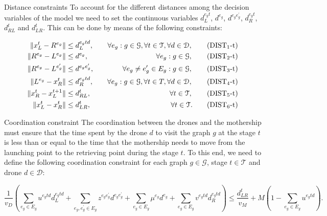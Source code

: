 \documentclass[slidestop,usepdftitle=false,10pt]{beamer}
\begin{document}
	\begin{frame}{Distance constraints}
	    To account for the different distances among the decision variables of the model we need to set the continuous variables $d_L^{e_gt}$, $d^{e_g}$, $d^{e_ge^\prime_g}$, $d_R^{e_gt}$, $d_{RL}^t$ and $d_{LR}^t$. This can be done by means of the following constraints:
        
        \begin{align*}
        \|x_L^t- R^{e_g}\| & \leq  d_L^{e_gtd},  &\quad \forall e_g:g\in \mathcal{G}, \forall t\in \mathcal T, \forall d\in\mathcal D, \tag{DIST$_{1}$-t} \label{eq:d1d}\\
        \|R^{e_g}- L^{e_g}\| & \leq  d^{e_g},  &\quad \forall e_g:g\in \mathcal{G}, \tag{DIST$_{2}$-t} \label{eq:d2}\\
        \|R^{e_g}- L^{e^\prime_g}\| & \leq  d^{e_ge^\prime_g}, &\quad \forall e_g\neq e_g'\in E_g:g\in \mathcal{G}, \tag{DIST$_{3}$-t} \label{eq:d3}\\
        \|L^{e_g}- x_R^t\| & \leq  d_R^{e_gtd}, &\quad \forall e_g:g\in \mathcal{G},\forall t\in T, \forall d\in\mathcal D, \tag{DIST$_{4}$-t} \label{eq:d4}\\
        \|x_R^t- x_L^{t+1}\| & \leq  d_{RL}^t, & \quad \forall t\in \mathcal T, \tag{DIST$_{5}$-t} \label{eq:d5}\\
        \|x_L^t- x_R^t\| & \leq  d_{LR}^t, & \quad \forall t\in \mathcal T. \tag{DIST$_{6}$-t} \label{eq:d6d}\\
        \end{align*}
	\end{frame}
	
	\begin{frame}{Coordination constraint}
        The coordination between the drones and the mothership must ensure that the time spent by the drone $d$ to visit the graph $g$ at the stage $t$ is less than or equal to the time that the mothership needs to move from the launching point to the retrieving point during the stage $t$. To this end, we need to define the following coordination constraint for each graph $g\in \mathcal G$, stage $t\in \mathcal T$ and drone $d\in\mathcal D$:
        
        \begin{tiny}
        {\color{red}
        \begin{equation}\tag{DCW}\label{DCW}
        \frac{1}{v_D}\left(\sum_{e_g\in E_g} u^{e_gtd}d_L^{e_gtd} + \sum_{e_g, e^\prime_g\in E_g}z^{e_ge^\prime_g}d^{e_ge^\prime_g} + \sum_{e_g\in E_g} \mu^{e_g}d^{e_g} + \sum_{e_g\in E_g} v^{e_gtd}d_R^{e_gtd}\right) \leq \frac{d_{LR}^t}{v_M} + M(1 - \sum_{e_g\in E_g} u^{e_gtd}).
        \end{equation}}
        \end{tiny}
	\end{frame}
	
\end{document}
